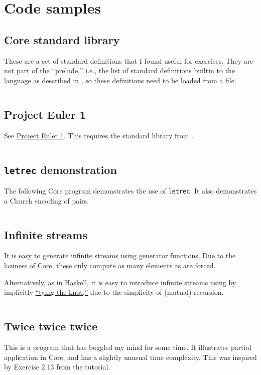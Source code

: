 
\section{Code samples}
\label{sec:code-samples}

\subsection{Core standard library}
\label{sec:core-stdlib}

These are a set of standard definitions that I found useful for exercises. They are not part of the ``prelude,'' i.e., the list of standard definitions builtin to the language as described in , so these definitions need to be loaded from a file.

\inputminted[frame=single]{text}{core/stdlib.core}

\subsection{Project Euler 1}
\label{sec:core-pe1}

See \href{https://projecteuler.net/problem=1}{Project Euler 1}. This requires the standard library from .

\inputminted[frame=single]{text}{core/pe1.core}

\subsection{\texttt{letrec} demonstration}
\label{sec:core-letrec}

The following Core program demonstrates the use of \texttt{letrec}. It also demonstrates a Church encoding of pairs.

\inputminted[frame=single]{text}{core/letrec.core}

\subsection{Infinite streams}
\label{sec:core-streams}

It is easy to generate infinite streams using generator functions. Due to the laziness of Core, these only compute as many elements as are forced.

Alternatively, as in Haskell, it is easy to introduce infinite streams using by implicitly \href{https://wiki.haskell.org/Tying_the_Knot}{``tying the knot,''} due to the simplicity of (mutual) recursion.

\inputminted[frame=single]{text}{core/streams.core}

\subsection{Twice twice twice}
\label{sec:core-twice-twice-twice}

This is a program that has boggled my mind for some time. It illustrates partial application in Core, and has a slightly unusual time complexity. This was inspired by Exercise 2.13 from the tutorial.

\inputminted[frame=single]{text}{core/twice.core}


